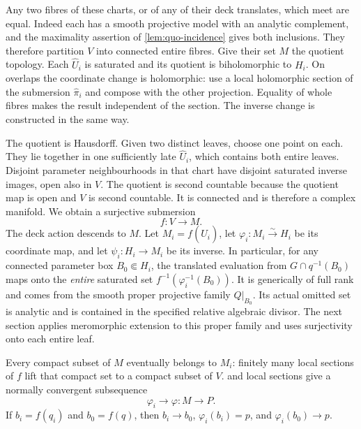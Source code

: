 Any two fibres of these charts, or of any of their deck translates, which meet are equal. Indeed each has a smooth projective model with an analytic complement, and the maximality assertion of \cref{lem:quo-incidence} gives both inclusions. They therefore partition $V$ into connected entire fibres. Give their set $M$ the quotient topology. Each $\widehat U_i$ is saturated and its quotient is biholomorphic to $H_i$. On overlaps the coordinate change is holomorphic: use a local holomorphic section of the submersion $\widehat\pi_i$ and compose with the other projection. Equality of whole fibres makes the result independent of the section. The inverse change is constructed in the same way.

The quotient is Hausdorff. Given two distinct leaves, choose one point on each. They lie together in one sufficiently late $\widehat U_i$, which contains both entire leaves. Disjoint parameter neighbourhoods in that chart have disjoint saturated inverse images, open also in $V$. The quotient is second countable because the quotient map is open and $V$ is second countable. It is connected and is therefore a complex manifold. We obtain a surjective submersion
\[
 f:V\longrightarrow M.
\]
The deck action descends to $M$. Let $M_i=f(\widehat U_i)$, let $\varphi_i:M_i\xrightarrow{\sim}H_i$ be its coordinate map, and let $\psi_i:H_i\to M_i$ be its inverse. In particular, for any connected parameter box $B_0\Subset H_i$, the translated evaluation from $G\cap q^{-1}(B_0)$ maps onto the \emph{entire} saturated set $f^{-1}(\varphi_i^{-1}(B_0))$. It is generically of full rank and comes from the smooth proper projective family $Q|_{B_0}$. Its actual omitted set is analytic and is contained in the specified relative algebraic divisor. The next section applies meromorphic extension to this proper family and uses surjectivity onto each entire leaf.

Every compact subset of $M$ eventually belongs to $M_i$: finitely many local sections of $f$ lift that compact set to a compact subset of $V$.  and local sections give a normally convergent subsequence
\[
 \varphi_i\longrightarrow\varphi:M\longrightarrow P.
\]
If $b_i=f(q_i)$ and $b_0=f(q)$, then $b_i\to b_0$, $\varphi_i(b_i)=p$, and $\varphi_i(b_0)\to p$.

